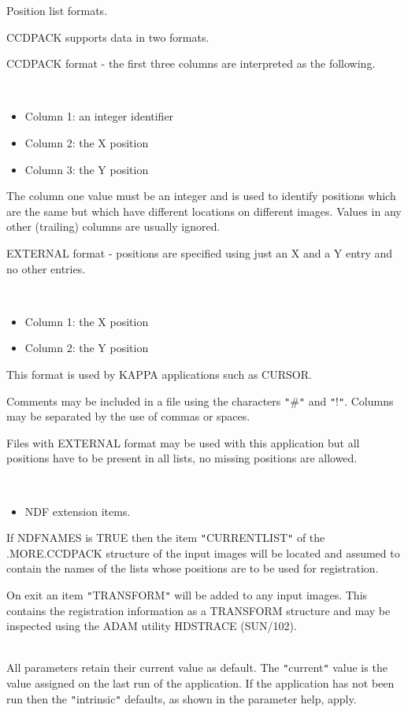 \documentclass[twoside,11pt]{article}
\newcommand{\xref}[3]{#1}
\renewcommand{\_}{\texttt{\symbol{95}}}
\newcommand{\qt}[1]{{\tt "}#1{\tt "}}
\newcommand{\sstdiytopic}[2]{\item[#1:] \mbox{} \\[1.3ex] #2}
\newcommand{\sstitemlist}[1]{
  \mbox{} \\
  \vspace{-3.5ex}
  \begin{itemize}
     #1
  \end{itemize}
}
\newcommand{\sstitem}{\item}
\newcommand{\sstdiytopic}[2]{\item[{#1}] #2 }
\newcommand{\sstitemlist}[1]{
      \begin{itemize}
         #1
      \end{itemize}
      \\
   }
\newcommand{\sstitem}{\item}
\begin{document}
{{{         \sstitem
         Position list formats.

      }
        CCDPACK supports data in two formats.

        CCDPACK format - the first three columns are interpreted as the
        following.

      \sstitemlist{

         \sstitem
              Column 1: an integer identifier

         \sstitem
              Column 2: the X position

         \sstitem
              Column 3: the Y position

      }
        The column one value must be an integer and is used to identify
        positions which are the same but which have different locations
        on different images. Values in any other (trailing) columns are
        usually ignored.

        EXTERNAL format - positions are specified using just an X and
        a Y entry and no other entries.

      \sstitemlist{

         \sstitem
              Column 1: the X position

         \sstitem
              Column 2: the Y position

      }
        This format is used by KAPPA applications such as
        \xref{CURSOR}{sun95}{CURSOR}.

        Comments may be included in a file using the characters \qt{\#} and
        \qt{!}. Columns may be separated by the use of commas or spaces.

        Files with EXTERNAL format may be used with this application but
        all positions have to be present in all lists, no missing
        positions are allowed.

      \sstitemlist{

         \sstitem
         NDF extension items.

      }
        If NDFNAMES is TRUE then the item \qt{CURRENT\_LIST} of the
        .MORE.CCDPACK structure of the input images will be located
        and assumed to contain the names of the lists whose positions
        are to be used for registration.

        On exit an item \qt{TRANSFORM} will be added to any input images.
        This contains the registration information as a TRANSFORM
        structure and may be inspected using the ADAM utility HDSTRACE
        (SUN/102).
   }
   \sstdiytopic{
      Behaviour of parameters
   } {
      All parameters retain their current value as default. The
      \qt{current} value is the value assigned on the last run of the
      application. If the application has not been run then the
      \qt{intrinsic} defaults, as shown in the parameter help, apply.

}}
\end{document}
